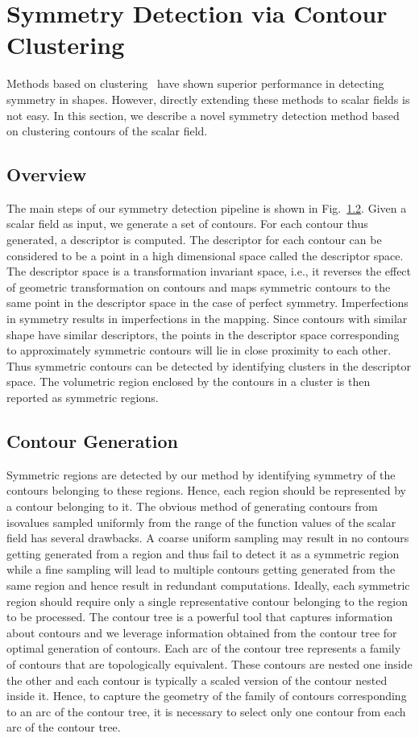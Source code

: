 \documentclass[review,journal]{vgtc}         %
\begin{document}
\section{Symmetry Detection via Contour Clustering}
Methods based on clustering~\cite{} have shown superior performance in detecting
symmetry in shapes. However, directly extending these methods to scalar fields
is not easy. In this section, we describe a novel symmetry detection method
based on clustering contours of the scalar field.
\subsection{Overview}
The main steps of our symmetry detection pipeline is shown in Fig.~\ref{}.
Given a scalar field as input, we generate a set of contours. For each contour
thus generated, a descriptor is computed. The descriptor for each contour
can be considered to be a point in a high dimensional space called the
descriptor space. The descriptor space is a transformation invariant space,
i.e., it reverses the effect of geometric transformation on contours and maps
symmetric contours to the same point in the descriptor space in the case of perfect
symmetry. Imperfections in symmetry results in imperfections in the mapping.
Since contours with similar shape have similar descriptors,
the points in the descriptor space corresponding to approximately symmetric 
contours will lie in close proximity to each other. Thus symmetric contours
can be detected by identifying clusters in the descriptor space. The volumetric
region enclosed by the contours in a cluster is then reported as
symmetric regions.
\subsection{Contour Generation}
Symmetric regions are detected by our method by identifying symmetry of the contours 
belonging to these regions. Hence, each region should be represented 
by a contour belonging to it. The obvious method of generating contours from isovalues
sampled uniformly from the range of the function values of the scalar field has several
drawbacks. A coarse uniform sampling may result in no contours getting generated from
a region and thus fail to detect it as a symmetric region while a fine sampling will lead
to multiple contours getting generated from the same region and hence result in redundant
computations. Ideally, each symmetric region should require only a single representative
contour belonging to the region to be processed.
The contour tree is a powerful tool that captures information about contours and we leverage
information obtained from the contour tree for optimal generation of contours. Each arc of
the contour tree represents a family of contours that are topologically equivalent. These
contours are nested one inside the other and each contour is typically a scaled version
of the contour nested inside it. Hence, to capture the geometry of the family
of contours corresponding to an arc of the contour tree, it is necessary to select only one
contour from each arc of the contour tree.
\end{document}

